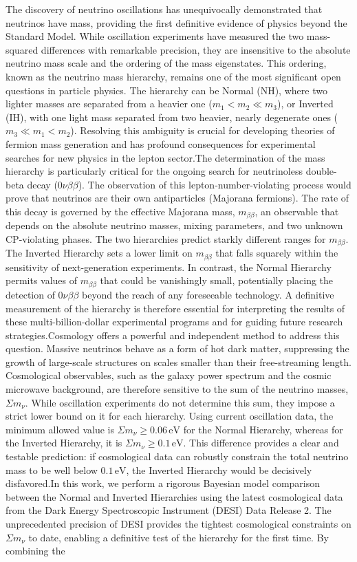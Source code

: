 \documentclass[]{article}
\begin{document}
The discovery of neutrino oscillations has unequivocally demonstrated that neutrinos have mass, providing the first definitive evidence of physics beyond the Standard Model. While oscillation experiments have measured the two mass-squared differences with remarkable precision, they are insensitive to the absolute neutrino mass scale and the ordering of the mass eigenstates. This ordering, known as the neutrino mass hierarchy, remains one of the most significant open questions in particle physics. The hierarchy can be Normal (NH), where two lighter masses are separated from a heavier one ($m_1 < m_2 \ll m_3$), or Inverted (IH), with one light mass separated from two heavier, nearly degenerate ones ($m_3 \ll m_1 < m_2$). Resolving this ambiguity is crucial for developing theories of fermion mass generation and has profound consequences for experimental searches for new physics in the lepton sector.The determination of the mass hierarchy is particularly critical for the ongoing search for neutrinoless double-beta decay ($0\nu\beta\beta$). The observation of this lepton-number-violating process would prove that neutrinos are their own antiparticles (Majorana fermions). The rate of this decay is governed by the effective Majorana mass, $m_{\beta\beta}$, an observable that depends on the absolute neutrino masses, mixing parameters, and two unknown CP-violating phases. The two hierarchies predict starkly different ranges for $m_{\beta\beta}$. The Inverted Hierarchy sets a lower limit on $m_{\beta\beta}$ that falls squarely within the sensitivity of next-generation experiments. In contrast, the Normal Hierarchy permits values of $m_{\beta\beta}$ that could be vanishingly small, potentially placing the detection of $0\nu\beta\beta$ beyond the reach of any foreseeable technology. A definitive measurement of the hierarchy is therefore essential for interpreting the results of these multi-billion-dollar experimental programs and for guiding future research strategies.Cosmology offers a powerful and independent method to address this question. Massive neutrinos behave as a form of hot dark matter, suppressing the growth of large-scale structures on scales smaller than their free-streaming length. Cosmological observables, such as the galaxy power spectrum and the cosmic microwave background, are therefore sensitive to the sum of the neutrino masses, $\Sigma m_\nu$. While oscillation experiments do not determine this sum, they impose a strict lower bound on it for each hierarchy. Using current oscillation data, the minimum allowed value is $\Sigma m_\nu \ge 0.06\,\text{eV}$ for the Normal Hierarchy, whereas for the Inverted Hierarchy, it is $\Sigma m_\nu \ge 0.1\,\text{eV}$. This difference provides a clear and testable prediction: if cosmological data can robustly constrain the total neutrino mass to be well below $0.1\,\text{eV}$, the Inverted Hierarchy would be decisively disfavored.In this work, we perform a rigorous Bayesian model comparison between the Normal and Inverted Hierarchies using the latest cosmological data from the Dark Energy Spectroscopic Instrument (DESI) Data Release 2. The unprecedented precision of DESI provides the tightest cosmological constraints on $\Sigma m_\nu$ to date, enabling a definitive test of the hierarchy for the first time. By combining the 
\end{document}
